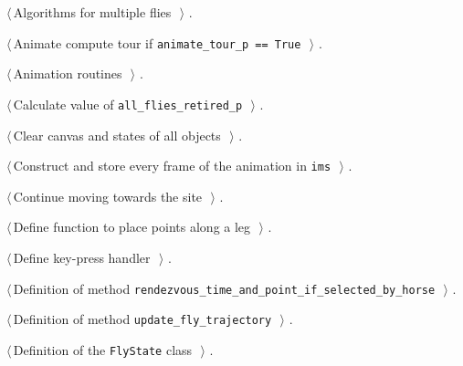 \documentclass[11.5pt]{report}
\begin{document}
{\small\begin{list}{}{\setlength{\itemsep}{-\parsep}\setlength{\itemindent}{-\leftmargin}}
\item $\langle\,$Algorithms for multiple flies\nobreak\ {\footnotesize {}}$\,\rangle$ {\footnotesize {\NWtxtRefIn} .}
\item $\langle\,$Animate compute tour if \verb|animate_tour_p == True|\nobreak\ {\footnotesize {}}$\,\rangle$ {\footnotesize {\NWtxtRefIn} .}
\item $\langle\,$Animation routines\nobreak\ {\footnotesize {}}$\,\rangle$ {\footnotesize {\NWtxtRefIn} .}
\item $\langle\,$Calculate value of \verb|all_flies_retired_p|\nobreak\ {\footnotesize {}}$\,\rangle$ {\footnotesize {\NWtxtRefIn} .}
\item $\langle\,$Clear canvas and states of all objects\nobreak\ {\footnotesize {}}$\,\rangle$ {\footnotesize {\NWtxtRefIn} .}
\item $\langle\,$Construct and store every frame of the animation in \verb|ims|\nobreak\ {\footnotesize {}}$\,\rangle$ {\footnotesize {\NWtxtRefIn} .}
\item $\langle\,$Continue moving towards the site\nobreak\ {\footnotesize {}}$\,\rangle$ {\footnotesize {\NWtxtRefIn} .}
\item $\langle\,$Define function to place points along a leg\nobreak\ {\footnotesize {}}$\,\rangle$ {\footnotesize {\NWtxtRefIn} .}
\item $\langle\,$Define key-press handler\nobreak\ {\footnotesize {}}$\,\rangle$ {\footnotesize {\NWtxtRefIn} .}
\item $\langle\,$Definition of method \verb|rendezvous_time_and_point_if_selected_by_horse|\nobreak\ {\footnotesize {}}$\,\rangle$ {\footnotesize {\NWtxtRefIn} .}
\item $\langle\,$Definition of method \verb|update_fly_trajectory|\nobreak\ {\footnotesize {}}$\,\rangle$ {\footnotesize {\NWtxtRefIn} .}
\item $\langle\,$Definition of the \verb|FlyState| class\nobreak\ {\footnotesize {}}$\,\rangle$ {\footnotesize {\NWtxtRefIn} .}

\end{list}}
\end{document}
